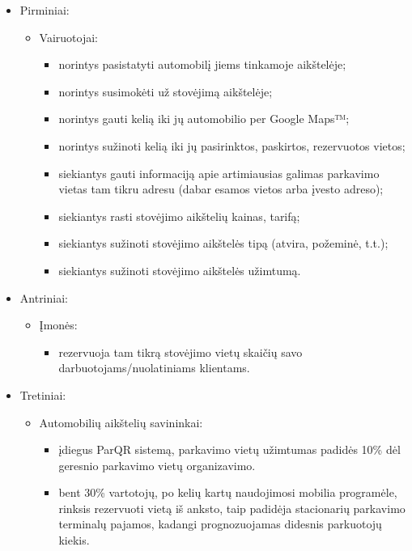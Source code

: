 \documentclass{VUMIFPSkursinis}
\begin{document}
\begin{itemize}[label={}]
	\item Pirminiai:
		\begin{itemize}[label={$\bullet$}]
			\item Vairuotojai:
				\begin{itemize}[label={--}]
					\item norintys pasistatyti automobilį jiems tinkamoje aikštelėje;
					\item norintys susimokėti už stovėjimą aikštelėje;
					\item norintys gauti kelią iki jų automobilio per Google Maps™;
					\item norintys sužinoti kelią iki jų pasirinktos, paskirtos, rezervuotos vietos;
					\item siekiantys gauti informaciją apie artimiausias galimas parkavimo vietas tam tikru adresu (dabar esamos vietos arba įvesto adreso);
					\item siekiantys rasti stovėjimo aikštelių kainas, tarifą;
					\item siekiantys sužinoti stovėjimo aikštelės tipą (atvira, požeminė, t.t.);
					\item siekiantys sužinoti stovėjimo aikštelės užimtumą.
				\end{itemize}
		\end{itemize}
	\item Antriniai:
		\begin{itemize}[label={$\bullet$}]					
			\item Įmonės:
				\begin{itemize}[label={--}]
					\item rezervuoja tam tikrą stovėjimo vietų skaičių savo darbuotojams/nuolatiniams klientams.
				\end{itemize}
		\end{itemize}
	\item Tretiniai:
		\begin{itemize}[label={$\bullet$}]
			\item Automobilių aikštelių savininkai:
				\begin{itemize}[label={--}]
					\item įdiegus ParQR sistemą, parkavimo vietų užimtumas padidės 10\% dėl geresnio parkavimo vietų organizavimo.
					\item bent 30\% vartotojų, po kelių kartų naudojimosi mobilia programėle, rinksis rezervuoti vietą iš anksto, taip padidėja stacionarių parkavimo terminalų pajamos, kadangi prognozuojamas didesnis parkuotojų kiekis.

\end{itemize}
\end{itemize}
\end{itemize}
\end{document}
